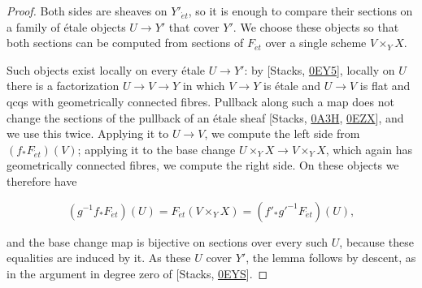 \documentclass[11pt]{article}
\begin{document}
\begin{proof}[{Proof}]\label{bp12}%
Both sides are sheaves on \(Y'_{\acute{e}t}\), so it is enough to compare their sections on a family of étale objects \(U\to Y'\) that cover \(Y'\). We choose these objects so that both sections can be computed from sections of \(F_{\acute{e}t}\) over a single scheme \(V\times_YX\).

Such objects exist locally on every étale \(U\to Y'\): by [Stacks, \href{https://stacks.math.columbia.edu/tag/0EY5}{0EY5}], locally on \(U\) there is a factorization \(U\to V\to Y\) in which \(V\to Y\) is étale and \(U\to V\) is flat and qcqs with geometrically connected fibres. Pullback along such a map does not change the sections of the pullback of an étale sheaf [Stacks, \href{https://stacks.math.columbia.edu/tag/0A3H}{0A3H}, \href{https://stacks.math.columbia.edu/tag/0EZX}{0EZX}], and we use this twice. Applying it to \(U\to V\), we compute the left side from \((f_*F_{\acute{e}t})(V)\); applying it to the base change \(U\times_YX\to V\times_YX\), which again has geometrically connected fibres, we compute the right side. On these objects we therefore have

\[
(g^{-1}f_*F_{\acute{e}t})(U)
=F_{\acute{e}t}(V\times_Y X)
=(f'_*g'^{-1}F_{\acute{e}t})(U),
\]

and the base change map is bijective on sections over every such \(U\), because these equalities are induced by it. As these \(U\) cover \(Y'\), the lemma follows by descent, as in the argument in degree zero of [Stacks, \href{https://stacks.math.columbia.edu/tag/0EYS}{0EYS}].
\end{proof}


\end{document}
